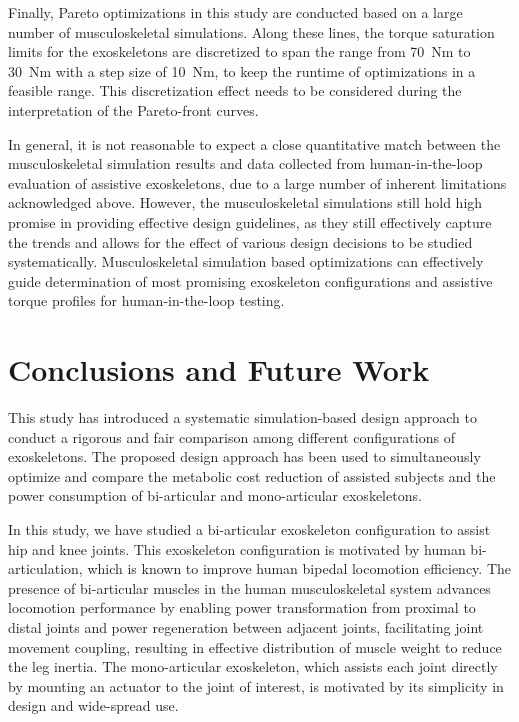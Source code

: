 \documentclass[10pt,letterpaper]{article}
\begin{document}
Finally, Pareto optimizations in this study are conducted based on a large number of musculoskeletal simulations. Along these lines, the torque saturation limits for the exoskeletons are discretized to span the range from 70~Nm to 30~Nm with a step size of 10~Nm, to keep the runtime of optimizations in a feasible range. This discretization effect needs to be considered during the interpretation of the Pareto-front curves.

In general, it is not reasonable to expect a close quantitative match between the musculoskeletal simulation results and data collected from human-in-the-loop evaluation of assistive exoskeletons, due to a large number of inherent limitations acknowledged above. However, the musculoskeletal simulations  still hold high promise in providing effective design guidelines, as they still effectively capture the trends and allows for the effect of various design decisions to be studied systematically. Musculoskeletal simulation based optimizations can effectively guide determination of most promising exoskeleton configurations and assistive torque profiles for human-in-the-loop testing.


\section*{Conclusions and Future Work}

This study has introduced a systematic simulation-based design approach to conduct a rigorous and fair comparison among different configurations of exoskeletons. The proposed design approach has been used to simultaneously optimize and compare the metabolic cost reduction of assisted subjects  and the power consumption of bi-articular and mono-articular exoskeletons.

In this study, we have studied a bi-articular exoskeleton configuration to assist hip and knee joints.  This exoskeleton configuration is motivated by human bi-articulation, which is known to improve human bipedal locomotion efficiency. The presence of bi-articular muscles in the human musculoskeletal system advances locomotion performance by enabling power transformation from proximal to distal joints and power regeneration between adjacent joints, facilitating joint movement coupling, resulting in effective distribution of muscle weight to reduce the leg inertia. The mono-articular exoskeleton, which assists each joint directly by mounting an actuator to the joint of interest, is motivated by its simplicity in design and wide-spread use.
\end{document}
